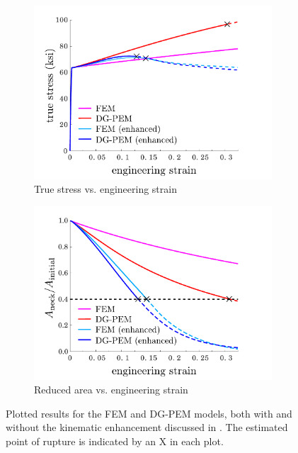 \begin{figure}[!h]
  \centering
    \begin{subfigure}[b]{0.49\linewidth}
            \centering
            \includegraphics[width=3.5in]{figures/necking_stress_strain.pdf}
    			\caption{True stress vs. engineering strain \label{fig:necking_stress_strain}}
    \end{subfigure}
	\begin{subfigure}[b]{0.49\linewidth}
            \centering
            \includegraphics[width=3.5in]{figures/necking_area_reduction.pdf}
    			\caption{Reduced area vs. engineering strain \label{fig:necking_area_reduction}}
    \end{subfigure} \caption{Plotted results for the FEM and DG-PEM models, both with and without the kinematic enhancement discussed in \cite{Rashid:06}. The estimated point of rupture is indicated by an X in each plot.}
  \label{fig:necking_plots}
\end{figure}

